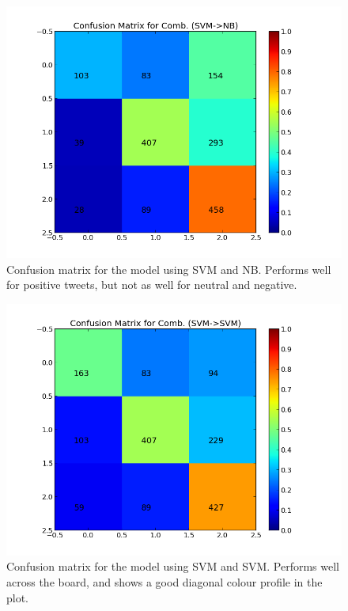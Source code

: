 \begin{minipage}[t!]{\linewidth}
     \centering
     \begin{minipage}{0.45\linewidth}
           \begin{figure}[H]
                \includegraphics[width=\linewidth]{../img/plots/grid/confusion_matrix_Comb-SVM-NB.png}
        		\caption[The confusion matrix for two-step SVM -> NB]{Confusion matrix for the model using SVM and NB. Performs well for positive tweets, but not as well for neutral and negative.}
            \label{fig:confmat_svm_nb}
           \end{figure}
      \end{minipage}
      \hspace{0.05\linewidth}
      \begin{minipage}{0.45\linewidth}
           \begin{figure}[H]
                \includegraphics[width=\linewidth]{../img/plots/grid/confusion_matrix_Comb-SVM-SVM.png}
         		\caption[The confusion matrix for two-step SVM -> SVM]{Confusion matrix for the model using SVM and SVM. Performs well across the board, and shows a good diagonal colour profile in the plot.}
            \label{fig:confmat_svm_svm}
           \end{figure}
      \end{minipage} \\
 \end{minipage}
 
